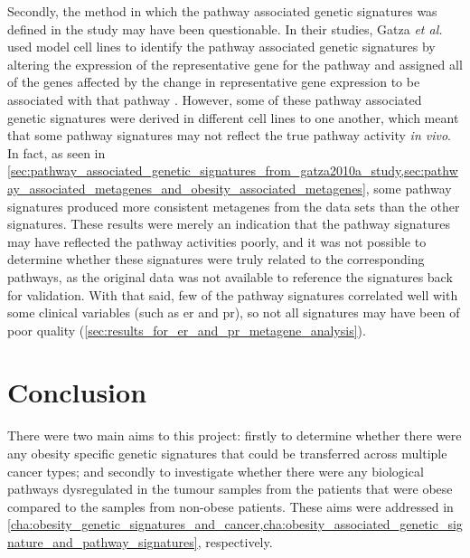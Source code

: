 Secondly, the method in which the pathway associated genetic signatures was defined in the \citet{Gatza2010a} study may have been questionable.
In their studies, Gatza \textit{et al.} used model cell lines to identify the pathway associated genetic signatures by altering the expression of the representative gene for the pathway and assigned all of the genes affected by the change in representative gene expression to be associated with that pathway \citep{Bild2006,Gatza2010a}.
However, some of these pathway associated genetic signatures were derived in different cell lines to one another, which meant that some pathway signatures may not reflect the true pathway activity \textit{in vivo}.
In fact, as seen in \cref{sec:pathway_associated_genetic_signatures_from_gatza2010a_study,sec:pathway_associated_metagenes_and_obesity_associated_metagenes}, some pathway signatures produced more consistent metagenes from the data sets than the other signatures.
These results were merely an indication that the pathway signatures may have reflected the pathway activities poorly, and it was not possible to determine whether these signatures were truly related to the corresponding pathways, as the original data was not available to reference the signatures back for validation.
With that said, few of the pathway signatures correlated well with some clinical variables (such as \gls{er} and \gls{pr}), so not all signatures may have been of poor quality (\cref{sec:results_for_er_and_pr_metagene_analysis}).

\section{Conclusion}
\label{sec:conclusion}

There were two main aims to this project: firstly to determine whether there were any obesity specific genetic signatures that could be transferred across multiple cancer types; and secondly to investigate whether there were any biological pathways dysregulated in the tumour samples from the patients that were obese compared to the samples from non-obese patients.
These aims were addressed in \cref{cha:obesity_genetic_signatures_and_cancer,cha:obesity_associated_genetic_signature_and_pathway_signatures}, respectively.


